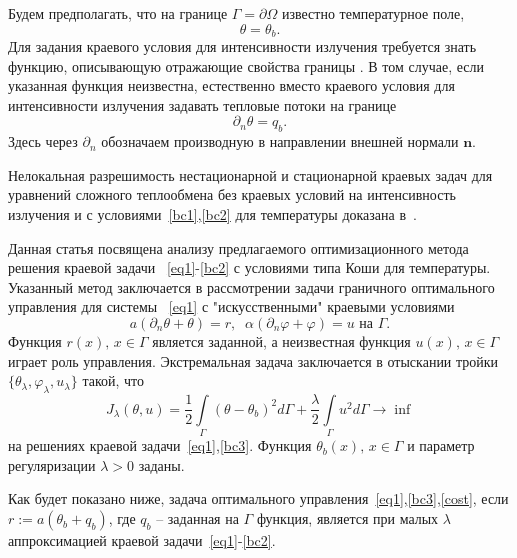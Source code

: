 \documentclass[12pt]{article}
\begin{document}
Будем предполагать, что на границе $\Gamma = \partial \Omega$ известно температурное поле,
\begin{equation}
\label{bc1} \theta = \theta_b.
\end{equation}
Для задания краевого условия для интенсивности излучения
требуется знать функцию, описывающую отражающие свойства границы \cite{JVM-14}.
В том случае, если указанная функция неизвестна, естественно вместо
краевого условия для интенсивности излучения задавать тепловые потоки на границе
\begin{equation}
\label{bc2} \partial_n\theta = q_b.
\end{equation}
Здесь через $\partial_n$ обозначаем производную в направлении
внешней нормали $\mathbf n$.

Нелокальная разрешимость
нестационарной и стационарной краевых задач для уравнений сложного теплообмена
без краевых условий на интенсивность излучения и
с условиями~\eqref{bc1},\eqref{bc2} для температуры доказана в~\cite{CNSNS19,CMMP20}.

Данная статья посвящена анализу предлагаемого оптимизационного метода решения краевой задачи
~\eqref{eq1}-\eqref{bc2} с условиями типа Коши для температуры.
Указанный метод заключается в рассмотрении задачи граничного оптимального управления для
системы ~\eqref{eq1} с  "искусственными" краевыми условиями
\begin{equation}
        \label{bc3} a(\partial_n\theta+\theta) = r,\;\; \alpha(\partial_n\varphi+\varphi) = u \text{  на  }\Gamma.
    \end{equation}
Функция $r(x),\, x\in\Gamma$ является заданной, а неизвестная функция $u(x),\, x\in\Gamma$
играет роль управления.
Экстремальная задача заключается в отыскании тройки $\{\theta_\lambda,\varphi_\lambda,u_\lambda\}$
    такой, что
    \begin{equation}
        \label{cost}
        J_\lambda(\theta, u) = \frac{1}{2}\int\limits_\Gamma (\theta - \theta_b)^2d\Gamma
        + \frac{\lambda}{2}\int\limits_\Gamma u^2d\Gamma \rightarrow\inf
    \end{equation}
на решениях краевой задачи~\eqref{eq1},\eqref{bc3}.
Функция $\theta_b(x),\, x\in\Gamma$  и параметр регуляризации $\lambda>0$ заданы.

Как будет показано ниже, задача оптимального управления~\eqref{eq1},\eqref{bc3},\eqref{cost}, если
    $r:=a(\theta_b+q_b)$, где $q_b$ -- заданная на $\Gamma$ функция,
    является при малых $\lambda$ аппроксимацией краевой задачи~\eqref{eq1}-\eqref{bc2}.
\end{document}
